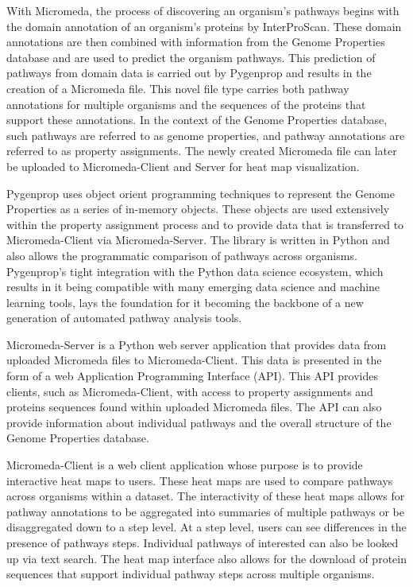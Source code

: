 With Micromeda, the process of discovering an organism's pathways begins with the domain annotation of an organism's proteins by InterProScan. These domain annotations are then combined with information from the Genome Properties database and are used to predict the organism pathways. This prediction of pathways from domain data is carried out by Pygenprop and results in the creation of a Micromeda file. This novel file type carries both pathway annotations for multiple organisms and the sequences of the proteins that support these annotations. In the context of the Genome Properties database, such pathways are referred to as genome properties, and pathway annotations are referred to as property assignments. The newly created Micromeda file can later be uploaded to Micromeda-Client and Server for heat map visualization.

Pygenprop uses object orient programming techniques to represent the Genome Properties as a series of in-memory objects. These objects are used extensively within the property assignment process and to provide data that is transferred to Micromeda-Client via Micromeda-Server. The library is written in Python and also allows the programmatic comparison of pathways across organisms. Pygenprop's tight integration with the Python data science ecosystem, which results in it being compatible with many emerging data science and machine learning tools, lays the foundation for it becoming the backbone of a new generation of automated pathway analysis tools.

Micromeda-Server is a Python web server application that provides data from uploaded Micromeda files to Micromeda-Client. This data is presented in the form of a web Application Programming Interface (API). This API provides clients, such as Micromeda-Client, with access to property assignments and proteins sequences found within uploaded Micromeda files. The API can also provide information about individual pathways and the overall structure of the Genome Properties database.

Micromeda-Client is a web client application whose purpose is to provide interactive heat maps to users. These heat maps are used to compare pathways across organisms within a dataset. The interactivity of these heat maps allows for pathway annotations to be aggregated into summaries of multiple pathways or be disaggregated down to a step level. At a step level, users can see differences in the presence of pathways steps. Individual pathways of interested can also be looked up via text search. The heat map interface also allows for the download of protein sequences that support individual pathway steps across multiple organisms.

